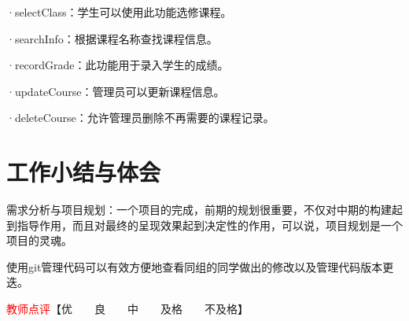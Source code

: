 \documentclass{article}
\begin{document}
·selectClass：学生可以使用此功能选修课程。

·searchInfo：根据课程名称查找课程信息。

·recordGrade：此功能用于录入学生的成绩。

·updateCourse：管理员可以更新课程信息。

·deleteCourse：允许管理员删除不再需要的课程记录。

\section{工作小结与体会}
需求分析与项目规划：一个项目的完成，前期的规划很重要，不仅对中期的构建起到指导作用，而且对最终的呈现效果起到决定性的作用，可以说，项目规划是一个项目的灵魂。
\par 使用git管理代码可以有效方便地查看同组的同学做出的修改以及管理代码版本更迭。

\vfill
\noindent\textcolor{red}{教师点评}【优~~~~良~~~~中~~~~及格~~~~不及格】
\end{document}
